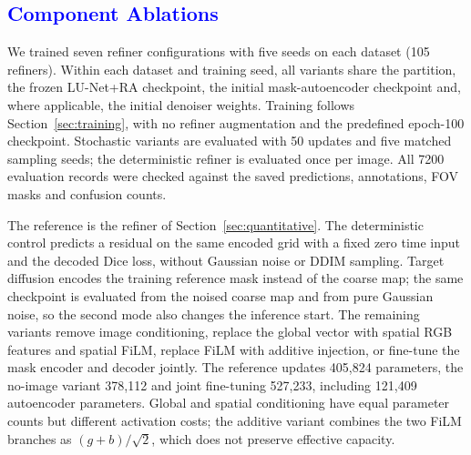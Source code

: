 \documentclass[jimaging,article,submit,pdftex,moreauthors]
  {Definitions/mdpi}
\DeclareRobustCommand{\rev}[1]{\textcolor{blue}{#1}}
\newcommand{\revbegin}{\begingroup\color{blue}}
\DeclareRobustCommand{\rev}[1]{#1}
\newcommand{\revbegin}{\begingroup}
\newcommand{\revend}{\ifhmode\par\fi\endgroup}
\providecommand{\linelabel}[1]{}
\newcommand{\seclabel}[1]{\linelabel{rev:sec:#1}}
\newcommand{\secend}[1]{\linelabel{rev:end:#1}}
\begin{document}
\FloatBarrier
\secend{oof}
\revend{}

\subsection{\rev{Component Ablations}}
\label{sec:ablations}
\seclabel{ablations}

\revbegin{}We trained seven refiner configurations with five seeds on each dataset (105 refiners). Within each dataset and training seed, all variants share the partition, the frozen LU-Net+RA checkpoint, the initial mask-autoencoder checkpoint and, where applicable, the initial denoiser weights. Training follows Section~\ref{sec:training}, with no refiner augmentation and the predefined epoch-100 checkpoint. Stochastic variants are evaluated with 50 updates and five matched sampling seeds; the deterministic refiner is evaluated once per image. All 7200 evaluation records were checked against the saved predictions, annotations, FOV masks and confusion counts.

The reference is the refiner of Section~\ref{sec:quantitative}. The deterministic control predicts a residual on the same encoded grid with a fixed zero time input and the decoded Dice loss, without Gaussian noise or DDIM sampling. Target diffusion encodes the training reference mask instead of the coarse map; the same checkpoint is evaluated from the noised coarse map and from pure Gaussian noise, so the second mode also changes the inference start. The remaining variants remove image conditioning, replace the global vector with spatial RGB features and spatial FiLM, replace FiLM with additive injection, or fine-tune the mask encoder and decoder jointly. The reference updates 405,824 parameters, the no-image variant 378,112 and joint fine-tuning 527,233, including 121,409 autoencoder parameters. Global and spatial conditioning have equal parameter counts but different activation costs; the additive variant combines the two FiLM branches as $(g+b)/\sqrt{2}$, which does not preserve effective capacity.
\end{document}
